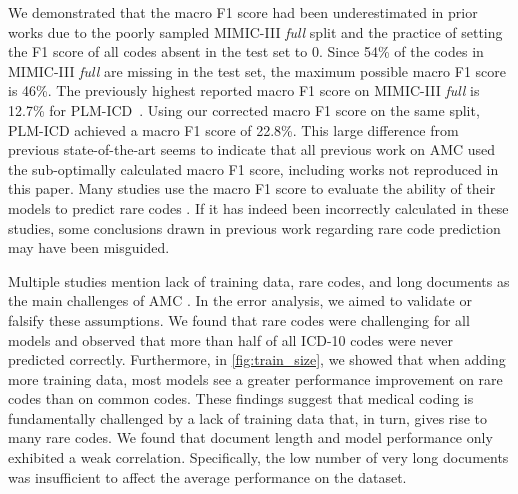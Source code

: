 {We demonstrated that the macro F1 score had been underestimated in prior works due to the poorly sampled MIMIC-III \textit{full} split and the practice of setting the F1 score of all codes absent in the test set to 0. Since 54\% of the codes in MIMIC-III \textit{full} are missing in the test set, the maximum possible macro F1 score is 46\%. The previously highest reported macro F1 score on MIMIC-III \textit{full} is 12.7\% for PLM-ICD~\cite{kimReadAttendCode2021}. Using our corrected macro F1 score on the same split, PLM-ICD achieved a macro F1 score of 22.8\%. This large difference from previous state-of-the-art seems to indicate that all previous work on AMC used the sub-optimally calculated macro F1 score, including works not reproduced in this paper. Many studies use the macro F1 score to evaluate the ability of their models to predict rare codes \cite{kimReadAttendCode2021, yuanCodeSynonymsMatter2022}. If it has indeed been incorrectly calculated in these studies, some conclusions drawn in previous work regarding rare code prediction may have been misguided.

Multiple studies mention lack of training data, rare codes, and long documents as the main challenges of AMC \cite{dongExplainableAutomatedCoding2021,feuchtDescriptionbasedLabelAttention2021,huangPLMICDAutomaticICD2022,jiDoesMagicBERT2021,liICDCodingClinical2020,liuEffectiveConvolutionalAttention2021,moonsComparisonDeepLearning2020,pascualBERTbasedAutomaticICD2021,tengReviewDeepNeural2022,tengExplainablePredictionMedical2020, vuLabelAttentionModel2020, venkateshAutomatingOverburdenedClinical2023}. In the error analysis, we aimed to validate or falsify these assumptions. We found that rare codes were challenging for all models and observed that more than half of all ICD-10 codes were never predicted correctly. Furthermore, in \cref{fig:train_size}, we showed that when adding more training data, most models see a greater performance improvement on rare codes than on common codes. 
These findings suggest that medical coding is fundamentally challenged by a lack of training data that, in turn, gives rise to many rare codes.
We found that document length and model performance only exhibited a weak correlation. Specifically, the low number of very long documents was insufficient to affect the average performance on the dataset. 

}
